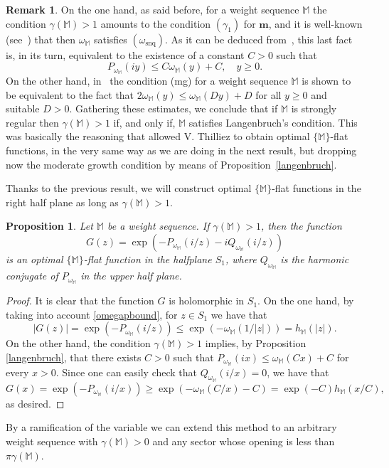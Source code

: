 \documentclass[11pt,a4paper]{article}
\theoremstyle{plain}
\newtheorem{prop}[theo]{Proposition}
\theoremstyle{definition}
\newtheorem{rema}[theo]{Remark}
\newcommand{\M}{\mathbb{M}}
\def\o{\omega}
\def\ga{\gamma}
\def\bm{\boldsymbol{m}}
\begin{document}
\begin{rema}
On the one hand, as said before, for a weight sequence $\M$ the condition $\ga(\M)>1$ amounts to the condition $(\ga_1)$ for $\bm$, and it is well-known (see~\cite[Prop.\ 4.4]{komatsu}) that then $\o_{\M}$ satisfies $(\omega_{\text{snq}})$.  As it can be deduced from~\cite[Prop.\ 1.7]{MeiseTaylor88}, this last fact is, in its turn, equivalent to the existence of a constant $C>0$ such that
$$
P_{\o_{\M}}(iy)\le C\o_{\M}(y)+C,\quad y\ge 0.
$$
On the other hand, in~\cite[Prop.\ 3.6]{komatsu} the condition (mg) for a weight sequence $\M$ is shown to be equivalent to the fact that $2\o_{\M}(y)\le \o_{\M}(Dy)+D$ for all $y\ge 0$ and suitable $D>0$. Gathering these estimates, we conclude that if $\M$ is strongly regular then $\ga(\M)>1$ if, and only if, $\M$ satisfies Langenbruch's condition. This was basically the reasoning that allowed V. Thilliez to obtain optimal $\{\M\}$-flat functions, in the very same way as we are doing in the next result, but dropping now the moderate growth condition by means of Proposition~\ref{langenbruch}.
\end{rema}


Thanks to the previous result, we will construct optimal $\{\M\}$-flat functions in the right half plane as long as $\gamma(\M)>1$.

\begin{prop}\label{optimalff-S1}	Let $\M$ be a weight sequence. If $\ga(\M)>1$, then the function $$
G(z)=\exp(-P_{\omega_\M}(i/z)-iQ_{\omega_\M}(i/z))
$$
is an optimal $\{\M\}$-flat function in the halfplane $S_1$, where $Q_{\omega_\M}$ is the harmonic conjugate of $P_{\omega_\M}$ in the upper half plane.
\end{prop}
\begin{proof}
It is clear that the function $G$ is holomorphic in $S_1$. On the one hand, by taking into account \eqref{omegapbound}, for $z\in S_1$ we have that
	$$|G(z)|=\exp(-P_{\omega_\M}(i/z))\leq \exp(-\omega_\M(1/|z|))=h_\M(|z|).$$
On the other hand, the condition $\ga(\M)>1$ implies, by Proposition \ref{langenbruch}, that there exists $C>0$ such that $P_{\omega_{\M}}(ix)\leq\omega_\M(Cx)+C$ for every $x>0$. Since one can easily check that $Q_{\omega_\M}(i/x)=0$, we have that
$$G(x)=\exp(-P_{\omega_\M}(i/x))\geq\exp(-\omega_\M(C/x)-C)= \exp(-C)h_\M(x/C),$$
as desired.
\end{proof}

By a ramification of the variable we can extend this method to an arbitrary weight sequence with $\ga(\M)>0$ and any sector whose opening is less than $\pi\ga(\M)$.
\end{document}
